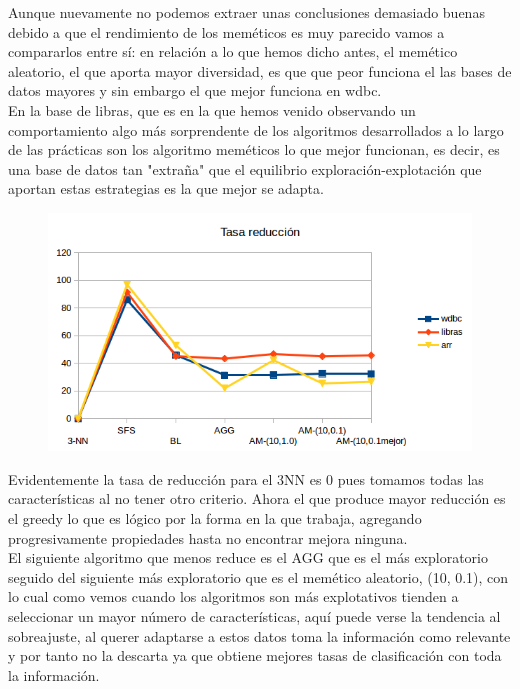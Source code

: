 \documentclass[10pt,a4paper]{article}
\begin{document}
Aunque nuevamente no podemos extraer unas conclusiones demasiado buenas debido a que el rendimiento de los meméticos es muy parecido vamos a compararlos entre sí: en relación a lo que hemos dicho antes, el memético aleatorio, el que aporta mayor diversidad, es que que peor funciona el las bases de datos mayores y sin embargo el que mejor funciona en wdbc.\\

En la base de libras, que es en la que hemos venido observando un comportamiento algo más sorprendente de los algoritmos desarrollados a lo largo de las prácticas son los algoritmo meméticos lo que mejor funcionan, es decir, es una base de datos tan "extraña" que el equilibrio exploración-explotación que aportan estas estrategias es la que mejor se adapta.\\

\begin{figure}[H]
\centering
\includegraphics[width=130mm]{reduccion_am.png}
\end{figure}

Evidentemente la tasa de reducción para el 3NN es 0 pues tomamos todas las características al no tener otro criterio. Ahora el que produce mayor reducción es el greedy lo que es lógico por la forma en la que trabaja, agregando progresivamente propiedades hasta no encontrar mejora ninguna.\\

El siguiente algoritmo que menos reduce es el AGG que es el más exploratorio seguido del siguiente más exploratorio que es el memético aleatorio, (10, 0.1), con lo cual como vemos cuando los algoritmos son más explotativos tienden a seleccionar un mayor número de características, aquí puede verse la tendencia al sobreajuste, al querer adaptarse a estos datos toma la información como relevante y por tanto no la descarta ya que obtiene mejores tasas de clasificación con toda la información.\\
\end{document}

